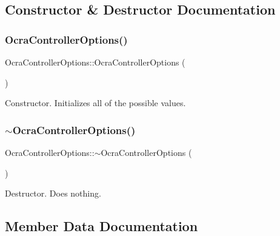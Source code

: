 \subsection{Constructor \& Destructor Documentation}
\hypertarget{classOcraControllerOptions_a1a91de992c42c6da488e95cd594eca80}{}\label{classOcraControllerOptions_a1a91de992c42c6da488e95cd594eca80} 
\subsubsection{\texorpdfstring{Ocra\+Controller\+Options()}{OcraControllerOptions()}}
{\footnotesize\ttfamily Ocra\+Controller\+Options\+::\+Ocra\+Controller\+Options (\begin{DoxyParamCaption}{ }\end{DoxyParamCaption})}

Constructor. Initializes all of the possible values. \hypertarget{classOcraControllerOptions_a22f514e92ccf91cc362c48a6c340ac19}{}\label{classOcraControllerOptions_a22f514e92ccf91cc362c48a6c340ac19} 
\subsubsection{\texorpdfstring{$\sim$\+Ocra\+Controller\+Options()}{~OcraControllerOptions()}}
{\footnotesize\ttfamily Ocra\+Controller\+Options\+::$\sim$\+Ocra\+Controller\+Options (\begin{DoxyParamCaption}{ }\end{DoxyParamCaption})}

Destructor. Does nothing. 

\subsection{Member Data Documentation}
\hypertarget{classOcraControllerOptions_aa533fe11c53b7fb17105f1edf48e1c0d}{}\label{classOcraControllerOptions_aa533fe11c53b7fb17105f1edf48e1c0d} 
